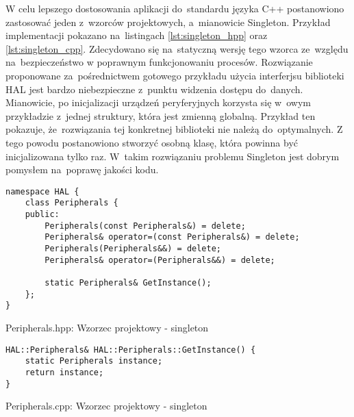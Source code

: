W celu lepszego dostosowania aplikacji do~standardu języka C++ postanowiono zastosować jeden z~wzorców
projektowych, a~mianowicie Singleton. Przykład implementacji pokazano na~listingach \ref{lst:singleton_hpp}
oraz \ref{lst:singleton_cpp}. Zdecydowano się na~statyczną wersję tego wzorca ze~względu na~bezpieczeństwo
w poprawnym funkcjonowaniu procesów. Rozwiązanie proponowane za~pośrednictwem gotowego przykładu użycia
interferjsu biblioteki HAL jest bardzo niebezpieczne z~punktu widzenia dostępu do~danych. Mianowicie, po
inicjalizacji urządzeń peryferyjnych korzysta się w~owym przykładzie z~jednej struktury, która jest zmienną
globalną. Przykład ten pokazuje, że~rozwiązania tej konkretnej biblioteki nie należą do~optymalnych.
Z tego powodu postanowiono stworzyć osobną klasę, która powinna być inicjalizowana tylko raz. W~takim
rozwiązaniu problemu Singleton jest dobrym pomysłem na~poprawę jakości kodu. \cite{cpp_bjarne}

\begin{listing}[htb]
\begin{verbatim}
namespace HAL {
    class Peripherals {
    public:
        Peripherals(const Peripherals&) = delete;
        Peripherals& operator=(const Peripherals&) = delete;
        Peripherals(Peripherals&&) = delete;
        Peripherals& operator=(Peripherals&&) = delete;

        static Peripherals& GetInstance();
    };
}
\end{verbatim}
\caption{Peripherals.hpp: Wzorzec projektowy - singleton}
\label{lst:singleton_hpp}
\end{listing}

\begin{listing}[htb]
\begin{verbatim}
HAL::Peripherals& HAL::Peripherals::GetInstance() {
    static Peripherals instance;
    return instance;
}
\end{verbatim}
\caption{Peripherals.cpp: Wzorzec projektowy - singleton}
\label{lst:singleton_cpp}
\end{listing}


